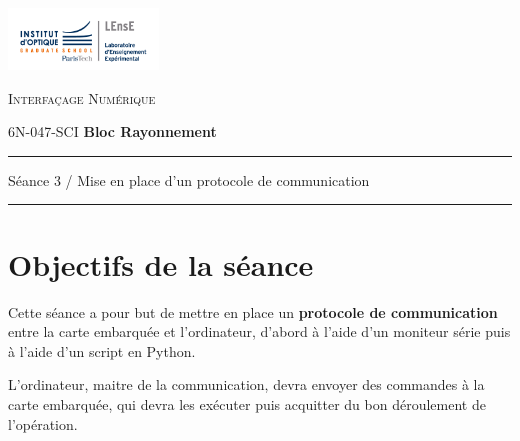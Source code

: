 \documentclass[a4paper,11pt,titlepage]{article} %
\begin{document}
\begin{minipage}[c]{.25\linewidth}
	\includegraphics[width=4cm]{images/Logo-LEnsE.png}
\end{minipage} \hfill
\begin{minipage}[c]{.4\linewidth}

\begin{center}
\vspace{0.3cm}
{\Large \textsc{Interfaçage Numérique}}

\medskip

6N-047-SCI \qquad \textbf{\large Bloc Rayonnement}

\end{center}
\end{minipage}\hfill

\vspace{0.5cm}

\noindent \rule{\linewidth}{1pt}

{\noindent\Large \rule[-7pt]{0pt}{30pt} Séance 3 / Mise en place d'un protocole de communication} 

\noindent \rule{\linewidth}{1pt}


\section{Objectifs de la séance}

Cette séance a pour but de mettre en place un \textbf{protocole de communication} entre la carte embarquée et l'ordinateur, d'abord à l'aide d'un moniteur série puis à l'aide d'un script en Python.

L'ordinateur, maitre de la communication, devra envoyer des commandes à la carte embarquée, qui devra les exécuter puis acquitter du bon déroulement de l'opération.
\end{document}
